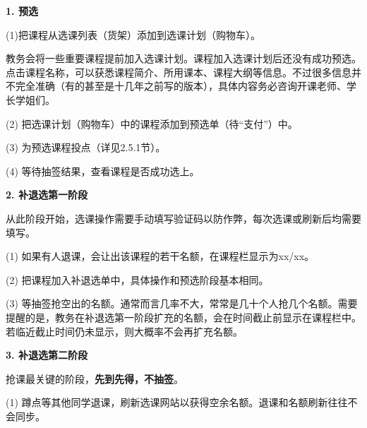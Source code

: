 \documentclass[11pt,oneside]{book}
\begin{document}
\vspace{10pt}

\textbf{1. 预选}

(1)把课程从选课列表（货架）添加到选课计划（购物车）。

教务会将一些重要课程提前加入选课计划。课程加入选课计划后还没有成功预选。点击课程名称，可以获悉课程简介、所用课本、课程大纲等信息。不过很多信息并不完全准确（有的甚至是十几年之前写的版本），具体内容务必咨询开课老师、学长学姐们。

\vspace{10pt}

(2) 把选课计划（购物车）中的课程添加到预选单（待“支付”）中。

\vspace{10pt}

(3) 为预选课程投点（详见2.5.1节）。

\vspace{10pt}

(4) 等待抽签结果，查看课程是否成功选上。

\vspace{10pt}

\textbf{2. 补退选第一阶段}

从此阶段开始，选课操作需要手动填写验证码以防作弊，每次选课或刷新后均需要填写。

\vspace{10pt}

(1) 如果有人退课，会让出该课程的若干名额，在课程栏显示为xx/xx。

\vspace{10pt}

(2) 把课程加入补退选单中，具体操作和预选阶段基本相同。

\vspace{10pt}

(3) 等抽签抢空出的名额。通常而言几率不大，常常是几十个人抢几个名额。需要提醒的是，教务在补退选第一阶段扩充的名额，会在时间截止前显示在课程栏中。若临近截止时间仍未显示，则大概率不会再扩充名额。

\vspace{10pt}

\textbf{3. 补退选第二阶段}

抢课最关键的阶段，\textbf{先到先得，不抽签}。

\vspace{10pt}

(1) 蹲点等其他同学退课，刷新选课网站以获得空余名额。退课和名额刷新往往不会同步。

\vspace{10pt}
\end{document}
